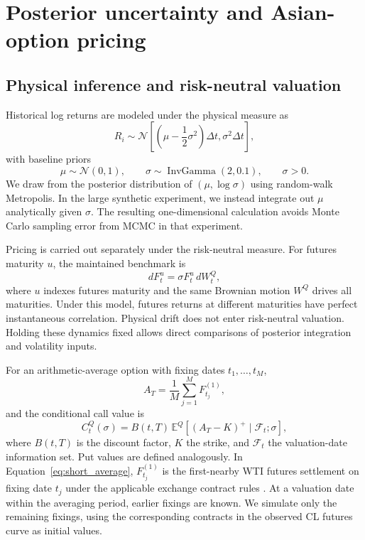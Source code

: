 \section{Posterior uncertainty and Asian-option pricing}\label{sec:short_method}

\subsection{Physical inference and risk-neutral valuation}

Historical log returns are modeled under the physical measure as
\begin{equation}
 R_i\sim
 \mathcal N\!\left[
 \left(\mu-\frac12\sigma^2\right)\Delta t,
 \sigma^2\Delta t
 \right],
 \label{eq:short_returns}
\end{equation}
with baseline priors
\begin{equation}
 \mu\sim\mathcal N(0,1),
 \qquad
 \sigma\sim\operatorname{InvGamma}(2,0.1),
 \qquad \sigma>0.
 \label{eq:short_priors}
\end{equation}
We draw from the posterior distribution of \((\mu,\log\sigma)\) using random-walk Metropolis. In the large synthetic experiment, we instead integrate out \(\mu\) analytically given \(\sigma\). The resulting one-dimensional calculation avoids Monte Carlo sampling error from MCMC in that experiment.

Pricing is carried out separately under the risk-neutral measure. For futures maturity \(u\), the maintained benchmark is
\begin{equation}
 dF_t^u=\sigma F_t^u\,dW_t^Q,
 \label{eq:short_q}
\end{equation}
where \(u\) indexes futures maturity and the same Brownian motion \(W^Q\) drives all maturities. Under this model, futures returns at different maturities have perfect instantaneous correlation. Physical drift does not enter risk-neutral valuation. Holding these dynamics fixed allows direct comparisons of posterior integration and volatility inputs.

For an arithmetic-average option with fixing dates \(t_1,\ldots,t_M\),
\begin{equation}
 A_T=\frac{1}{M}\sum_{j=1}^M F^{(1)}_{t_j},
 \label{eq:short_average}
\end{equation}
and the conditional call value is
\begin{equation}
 C_t^Q(\sigma)
 =
 B(t,T)\,
 \mathbb E^Q\!\left[
 (A_T-K)^+\mid\mathcal F_t;\sigma
 \right],
 \label{eq:short_call_value}
\end{equation}
where \(B(t,T)\) is the discount factor, \(K\) the strike, and \(\mathcal F_t\) the valuation-date information set. Put values are defined analogously. In Equation~\eqref{eq:short_average}, \(F^{(1)}_{t_j}\) is the first-nearby WTI futures settlement on fixing date \(t_j\) under the applicable exchange contract rules \citep{cme_wti_apo_rule}. At a valuation date within the averaging period, earlier fixings are known. We simulate only the remaining fixings, using the corresponding contracts in the observed CL futures curve as initial values.

